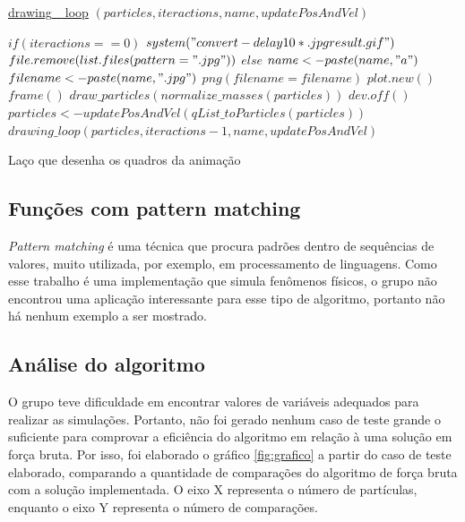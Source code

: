\documentclass[rel_mlp]{iiufrgs}
\begin{document}
    \begin{algorithm}
	\label{drawing_loop}
    \underline{drawing{\_}
loop} $(particles, iteractions, name, updatePosAndVel)$\;

  $if (iteractions == 0) $\;
  $  system("convert -delay 10 *.jpg result.gif") $\;
  $  file.remove(list.files(pattern=".jpg")) $\;
  $else $\;
  $  name <- paste(name, "a") $\;
  $  filename <- paste(name, ".jpg") $\;
  $  png(filename = filename) $\;
  $  plot.new() $\;
  $  frame() $\;
  $  draw{\_}particles(normalize{\_}masses(particles)) $\;
  $  dev.off() $\;
  $  particles <- updatePosAndVel(qList{\_}toParticles(particles)) $\;
  $  drawing{\_}loop(particles, iteractions-1, name, updatePosAndVel) $\;
    \caption{Laço que desenha os quadros da animação}
    \end{algorithm}

    \subsection{Funções com pattern matching}

    \textit{Pattern matching} é uma técnica que procura padrões dentro de sequências de valores, muito utilizada, por exemplo, em processamento de linguagens. Como esse trabalho é uma implementação que simula fenômenos físicos, o grupo não encontrou uma aplicação interessante para esse tipo de algoritmo, portanto não há nenhum exemplo a ser mostrado.

\subsection{Análise do algoritmo}

O grupo teve dificuldade em encontrar valores de variáveis adequados para realizar as simulações. Portanto,
não foi gerado nenhum caso de teste grande o suficiente para comprovar a eficiência do algoritmo em relação
à uma solução em força bruta. Por isso, foi elaborado o gráfico \ref{fig:grafico} a partir do caso de teste elaborado, comparando
a quantidade de comparações do algoritmo de força bruta com a solução implementada. O eixo X representa o número
de partículas, enquanto o eixo Y representa o número de comparações.
\end{document}
